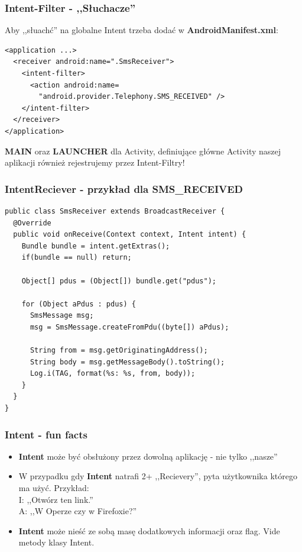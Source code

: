 \documentclass{beamer}
\begin{document}
\begin{frame}[fragile]\frametitle{Intent-Filter - ,,Słuchacze''}
Aby ,,słuachć'' na globalne Intent trzeba dodać w \textbf{AndroidManifest.xml}:
\begin{lstlisting}
<application ...>
  <receiver android:name=".SmsReceiver"> 
    <intent-filter> 
      <action android:name=
        "android.provider.Telephony.SMS_RECEIVED" /> 
    </intent-filter> 
  </receiver>
</application>
\end{lstlisting}

\pause

\textbf{MAIN} oraz \textbf{LAUNCHER} dla Activity, definiujące główne Activity naszej aplikacji również rejestrujemy przez Intent-Filtry!

\end{frame}

\begin{frame}[fragile]\frametitle{IntentReciever - przykład dla \textbf{SMS\_RECEIVED}}
\begin{lstlisting}
public class SmsReceiver extends BroadcastReceiver {
  @Override
  public void onReceive(Context context, Intent intent) {
    Bundle bundle = intent.getExtras();
    if(bundle == null) return;

    Object[] pdus = (Object[]) bundle.get("pdus");

    for (Object aPdus : pdus) {
      SmsMessage msg;
      msg = SmsMessage.createFromPdu((byte[]) aPdus);
      
      String from = msg.getOriginatingAddress();
      String body = msg.getMessageBody().toString();
      Log.i(TAG, format(%s: %s, from, body));                     
    }
  }
}
\end{lstlisting}
\end{frame}


\begin{frame}\frametitle{Intent - fun facts}
\begin{itemize}
 \item \textbf{Intent} może być obsłużony przez dowolną aplikację - nie tylko ,,nasze''
 \pause \item W przypadku gdy \textbf{Intent} natrafi 2+ ,,Recievery'', pyta użytkownika którego ma użyć. Przykład: \\
              \pause I: ,,Otwórz ten link.''\\
              \pause A: ,,W Operze czy w Firefoxie?''
              
             
 \pause \item \textbf{Intent} może nieść ze sobą masę dodatkowych informacji oraz flag. Vide metody klasy Intent.
\end{itemize}
\end{frame}
\end{document}
